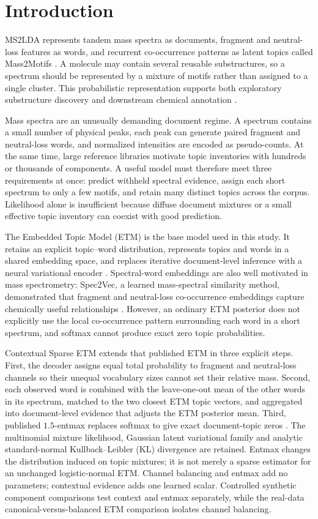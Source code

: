 \documentclass[10pt,a4paper]{article}
\begin{document}
\section{Introduction}

MS2LDA represents tandem mass spectra as documents, fragment and neutral-loss
features as words, and recurrent co-occurrence patterns as latent topics called
Mass2Motifs \cite{vanderhooft2016}. A molecule may contain several reusable
substructures, so a spectrum should be represented by a mixture of motifs rather
than assigned to a single cluster. This probabilistic representation supports
both exploratory substructure discovery and downstream chemical annotation
\cite{torresortega2026}.

Mass spectra are an unusually demanding document regime. A spectrum contains a
small number of physical peaks, each peak can generate paired fragment and
neutral-loss words, and normalized intensities are encoded as pseudo-counts.
At the same time, large reference libraries motivate topic inventories with
hundreds or thousands of components. A useful model must therefore meet three
requirements at once: predict withheld spectral evidence, assign each short
spectrum to only a few motifs, and retain many distinct topics across the
corpus. Likelihood alone is insufficient because diffuse document mixtures or a
small effective topic inventory can coexist with good prediction.

The Embedded Topic Model (ETM) is the base model used in this study. It
retains an explicit topic--word distribution, represents topics and words in a
shared embedding space, and replaces iterative document-level inference with a
neural variational encoder \cite{dieng2020}. Spectral-word embeddings are also
well motivated in mass spectrometry: Spec2Vec, a learned mass-spectral
similarity method, demonstrated that fragment and neutral-loss co-occurrence
embeddings capture chemically useful relationships \cite{huber2021}. However,
an ordinary ETM posterior does not explicitly use
the local co-occurrence pattern surrounding each word in a short spectrum, and
softmax cannot produce exact zero topic probabilities.

Contextual Sparse ETM extends that published ETM in three explicit steps. First,
the decoder assigns equal total probability to fragment and neutral-loss
channels so their unequal vocabulary sizes cannot set their relative mass.
Second, each observed word is combined with the leave-one-out mean of the other
words in its spectrum, matched to the two closest ETM topic vectors, and
aggregated into document-level evidence that adjusts the ETM posterior mean.
Third, published $1.5$-entmax replaces softmax to give exact document-topic
zeros \cite{peters2019}. The multinomial mixture likelihood, Gaussian latent
variational family and analytic standard-normal Kullback--Leibler (KL)
divergence are retained. Entmax changes the distribution induced on topic
mixtures; it is not merely a sparse estimator for an unchanged logistic-normal
ETM. Channel
balancing and entmax add no parameters; contextual evidence adds one learned
scalar. Controlled synthetic component comparisons test context and entmax
separately, while the real-data canonical-versus-balanced ETM comparison
isolates channel balancing.
\end{document}
